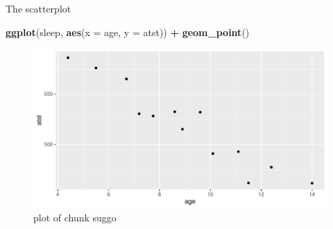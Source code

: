 \documentclass[ignorenonframetext,]{beamer}
\newenvironment{Shaded}{\begin{snugshade}}{\end{snugshade}}
\newcommand{\DataTypeTok}[1]{\textcolor[rgb]{0.13,0.29,0.53}{#1}}
\newcommand{\KeywordTok}[1]{\textcolor[rgb]{0.13,0.29,0.53}{\textbf{#1}}}
\newcommand{\NormalTok}[1]{#1}
\newcommand{\OperatorTok}[1]{\textcolor[rgb]{0.81,0.36,0.00}{\textbf{#1}}}
\newcommand{\StringTok}[1]{\textcolor[rgb]{0.31,0.60,0.02}{#1}}
\begin{document}
\begin{frame}[fragile]{The scatterplot}
\protect\hypertarget{the-scatterplot}{}

\begin{Shaded}
\begin{Highlighting}[]
\KeywordTok{ggplot}\NormalTok{(sleep, }\KeywordTok{aes}\NormalTok{(}\DataTypeTok{x =}\NormalTok{ age, }\DataTypeTok{y =}\NormalTok{ atst)) }\OperatorTok{+}\StringTok{ }\KeywordTok{geom_point}\NormalTok{()}
\end{Highlighting}
\end{Shaded}

\begin{figure}
\centering
\includegraphics{figure/suggo-1.pdf}
\caption{plot of chunk suggo}
\end{figure}

\end{frame}
\end{document}
